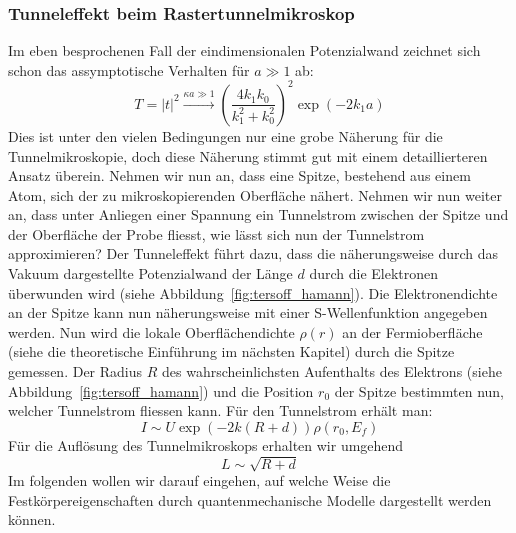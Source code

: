 \subsubsection{Tunneleffekt beim Rastertunnelmikroskop}
Im eben besprochenen Fall der eindimensionalen Potenzialwand zeichnet sich schon das
assymptotische Verhalten für $a\gg1$ ab:
\begin{equation}
    T = \left | t \right |^2 \overset{\kappa a \gg 1}{\rightarrow} (\frac{4k_1k_0}{k_1^2+k_0^2})^2 
    \exp(-2k_1a)
\end{equation}
Dies ist unter den vielen Bedingungen nur eine grobe Näherung für die Tunnelmikroskopie, doch
diese Näherung stimmt gut mit einem detaillierteren Ansatz überein.
Nehmen wir nun an, dass eine Spitze, bestehend aus einem Atom, sich der zu mikroskopierenden
Oberfläche nähert. Nehmen wir nun weiter an, dass unter Anliegen einer Spannung ein Tunnelstrom
zwischen der Spitze und der Oberfläche der Probe fliesst, wie lässt sich nun der Tunnelstrom
approximieren? Der Tunneleffekt führt dazu, dass die näherungsweise durch das Vakuum 
dargestellte Potenzialwand der Länge $d$ durch die Elektronen überwunden wird (siehe
Abbildung~\ref{fig:tersoff_hamann}). Die Elektronendichte an der Spitze kann nun näherungsweise
mit einer S-Wellenfunktion angegeben werden\cite{staatsexamen}. 
Nun wird die lokale Oberflächendichte $\rho(r)$ an
der Fermioberfläche (siehe die theoretische Einführung
im nächsten Kapitel) durch die Spitze gemessen. Der Radius $R$ des wahrscheinlichsten Aufenthalts
des Elektrons (siehe Abbildung~\ref{fig:tersoff_hamann}) und die Position $r_0$ der Spitze 
bestimmten nun, welcher Tunnelstrom fliessen kann.
Für den Tunnelstrom erhält man:
\begin{equation}
    I \sim U \exp(-2k(R+d)) \rho(r_0,E_f)
\end{equation}
Für die Auflösung des Tunnelmikroskops erhalten wir umgehend
\begin{equation}
    L \sim \sqrt{R+d} 
\end{equation}
Im folgenden wollen wir darauf eingehen, auf welche Weise die Festkörpereigenschaften
durch quantenmechanische Modelle dargestellt werden können. 
